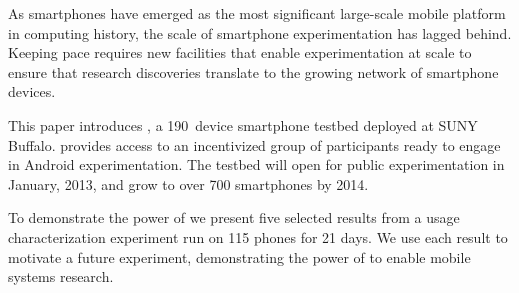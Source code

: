 As smartphones have emerged as the most significant large-scale mobile
platform in computing history, the scale of smartphone experimentation has
lagged behind. Keeping pace requires new facilities that enable
experimentation at scale to ensure that research discoveries translate to the
growing network of smartphone devices.


This paper introduces \PhoneLab{}, a 190~device smartphone testbed deployed
at SUNY Buffalo. \PhoneLab{} provides access to an incentivized group of
participants ready to engage in Android experimentation. The testbed will
open for public experimentation in January, 2013, and grow to over 700
smartphones by 2014.



To demonstrate the power of \PhoneLab{} we present five selected results from
a usage characterization experiment run on 115 phones for 21 days. We use
each result to motivate a future \PhoneLab{} experiment, demonstrating the
power of \PhoneLab{} to enable mobile systems research.
